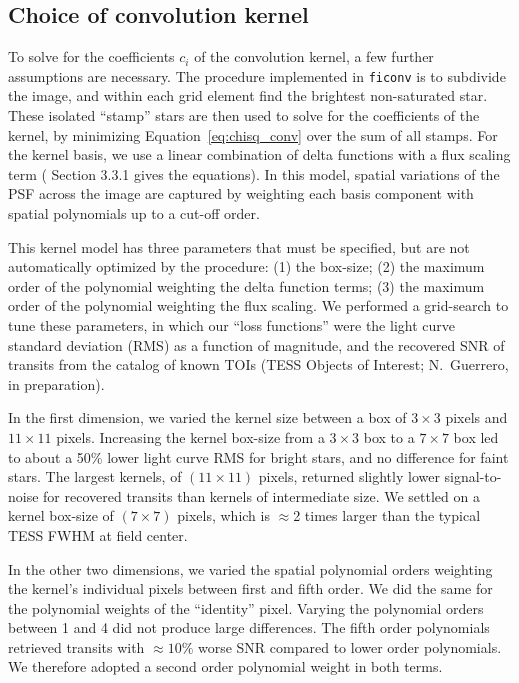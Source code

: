\documentclass[12pt,twocolumn,tighten,trackchanges]{aastex62}
\begin{document}
\subsection{Choice of convolution kernel}
\label{subsec:tuneconvkernel}

To solve for the coefficients $c_i$ of the convolution kernel, a few
further assumptions are necessary.  The procedure implemented in
\texttt{ficonv} is to subdivide the image, and within each grid
element find the brightest non-saturated star. These isolated
``stamp'' stars are then used to solve for the coefficients of the
kernel, by minimizing Equation~\ref{eq:chisq_conv} over the sum of all
stamps.  For the kernel basis, we use a linear combination of delta
functions with a flux scaling term
(\citealt{soares-furtado_image_2017} Section 3.3.1 gives the
equations).  In this model, spatial variations of the PSF across the
image are captured by weighting each basis component with spatial
polynomials up to a cut-off order.

This kernel model has three parameters that must be specified, but are
not automatically optimized by the procedure: (1) the box-size; (2)
the maximum order of the polynomial weighting the delta function
terms; (3) the maximum order of the polynomial weighting the flux
scaling.  We performed a grid-search to tune these parameters, in
which our ``loss functions'' were the light curve standard deviation
(RMS) as a function of magnitude, and the recovered SNR of transits
from the catalog of known TOIs (TESS Objects of Interest; N.~Guerrero,
in preparation).

In the first dimension, we varied the kernel size between a box of
$3\times3$ pixels and $11\times11$ pixels.  Increasing the kernel
box-size from a $3\times3$ box to a $7\times7$ box led to about a 50\%
lower light curve RMS for bright stars, and no difference for faint
stars.  The largest kernels, of $(11\times11)$ pixels, returned
slightly lower signal-to-noise for recovered transits than kernels of
intermediate size.  We settled on a kernel box-size of $(7\times7)$
pixels, which is $\approx$2 times larger than the typical TESS FWHM at
field center. 

In the other two dimensions, we varied the spatial polynomial orders
weighting the kernel's individual pixels between first and fifth
order.  We did the same for the polynomial weights of the ``identity''
pixel.  Varying the polynomial orders between 1 and 4 did not produce
large differences.  The fifth order polynomials retrieved transits
with $\approx10\%$ worse SNR compared to lower order polynomials.  We
therefore adopted a second order polynomial weight in both terms.
\end{document}
